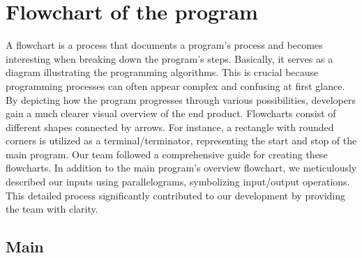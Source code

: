 \section{Flowchart of the program}

A flowchart is a process that documents a program's process and becomes
interesting when breaking down the program's steps.
Basically, it serves as a diagram illustrating the programming algorithms.
This is crucial because programming processes can often appear
complex and confusing at first glance.
By depicting how the program progresses through various possibilities,
developers gain a much clearer visual overview of the end product.
Flowcharts consist of different shapes connected by arrows.
For instance, a rectangle with rounded corners is utilized as a
terminal/terminator, representing the start and stop of the main program.
Our team followed a comprehensive guide for creating these flowcharts.
In addition to the main program's overview flowchart,
we meticulously described our inputs using parallelograms, symbolizing input/output operations.
This detailed process significantly contributed to our development by providing the team with clarity.


\subsection{Main}
\noindent
{}

